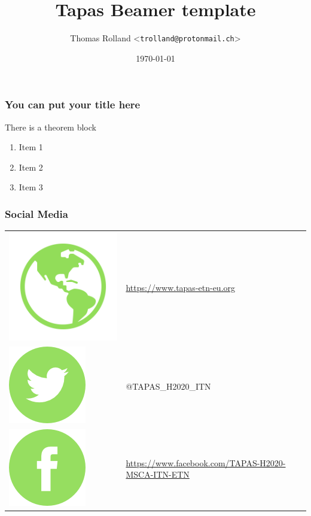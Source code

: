 \documentclass{beamer}
\title{Tapas Beamer template}
\date{\today}
\author{Thomas Rolland <\texttt{trolland@protonmail.ch}>}
\begin{document}
\begin{frame}[plain]
\titlepage
\end{frame}


\begin{frame} 
\frametitle{You can put your title here} 
\begin{theorem}
There is a theorem block \end{theorem} 
\begin{enumerate} 
\item Item 1
\item Item 2
\item Item 3
\end{enumerate}
\end{frame}


\begin{frame}
\frametitle{Social Media}
\begin{tabular}{ll}
\hspace{-0.1cm}\includegraphics[scale=0.4]{img/website.png} & \url{https://www.tapas-etn-eu.org}\vspace{0.3cm}\\ 
\includegraphics{img/twitter.png} & @TAPAS\_H2020\_ITN\vspace{0.4cm}\\
\includegraphics{img/facebook.png} & \url{https://www.facebook.com/TAPAS-H2020-MSCA-ITN-ETN}
\end{tabular}
\end{frame}
\end{document}
